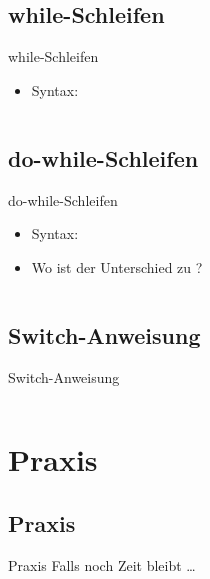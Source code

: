 \documentclass[usepdftitle=false,hyperref={pdfpagelabels=false}]{beamer}
\begin{document}
\subsection{while-Schleifen}
\begin{frame}{while-Schleifen}
  \begin{itemize}
    \item Syntax: 
  \end{itemize}

  \inputminted[linenos=true, numbersep=5pt, tabsize=4, fontsize=\small, firstline=35, lastline=37]{java}{Kontrollstrukturen.java}
\end{frame}

\subsection{do-while-Schleifen}
\begin{frame}{do-while-Schleifen}
  \begin{itemize}
    \item Syntax: 
    \item Wo ist der Unterschied zu ?
  \end{itemize}

  \inputminted[linenos=true, numbersep=5pt, tabsize=4, fontsize=\small, firstline=43, lastline=49]{java}{Kontrollstrukturen.java}
\end{frame}

\subsection{Switch-Anweisung}
\begin{frame}{Switch-Anweisung}
  \inputminted[linenos=true, numbersep=5pt, tabsize=4, fontsize=\tiny, frame=lines, firstline=15, lastline=33, label=World.java]{java}{Kontrollstrukturen.java}
\end{frame}

\section{Praxis}
\subsection{Praxis}
\begin{frame}{Praxis}
  Falls noch Zeit bleibt \dots
\end{frame}
\end{document}
